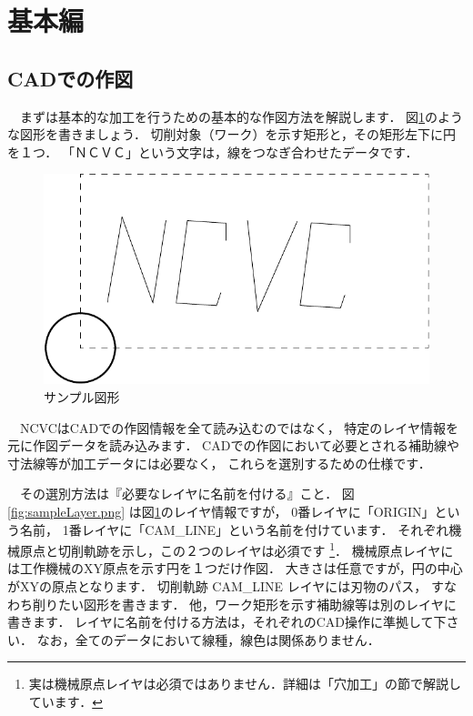 
\section{基本編}

\subsection{CADでの作図}

\begin{minipage}[t]{0.4\textwidth}
　まずは基本的な加工を行うための基本的な作図方法を解説します．
図\ref{fig:sample1.jww}のような図形を書きましょう．
切削対象（ワーク）を示す矩形と，その矩形左下に円を１つ．
「ＮＣＶＣ」という文字は，線をつなぎ合わせたデータです．
\end{minipage}
\begin{minipage}[t]{0.6\textwidth}
\vspace*{-2zh}
\begin{figure}[H]
\centering
\includegraphics[scale=0.8]{No1/fig/sample1.pdf}
\caption{サンプル図形}
\label{fig:sample1.jww}
\end{figure}
\end{minipage}

\vspace*{2zh}
　NCVCはCADでの作図情報を全て読み込むのではなく，
特定のレイヤ情報を元に作図データを読み込みます．
CADでの作図において必要とされる補助線や寸法線等が加工データには必要なく，
これらを選別するための仕様です．

　その選別方法は『必要なレイヤに名前を付ける』こと．
図\ref{fig:sampleLayer.png} は図\ref{fig:sample1.jww}のレイヤ情報ですが，
0番レイヤに「ORIGIN」という名前，
1番レイヤに「CAM\_LINE」という名前を付けています．
それぞれ機械原点と切削軌跡を示し，この２つのレイヤは必須です
\footnote{実は機械原点レイヤは必須ではありません．詳細は「穴加工」の節で解説しています．}．
機械原点レイヤには工作機械のXY原点を示す円を１つだけ作図．
大きさは任意ですが，円の中心がXYの原点となります．
切削軌跡 CAM\_LINE レイヤには刃物のパス，
すなわち削りたい図形を書きます．
他，ワーク矩形を示す補助線等は別のレイヤに書きます．
レイヤに名前を付ける方法は，それぞれのCAD操作に準拠して下さい．
なお，全てのデータにおいて線種，線色は関係ありません．

